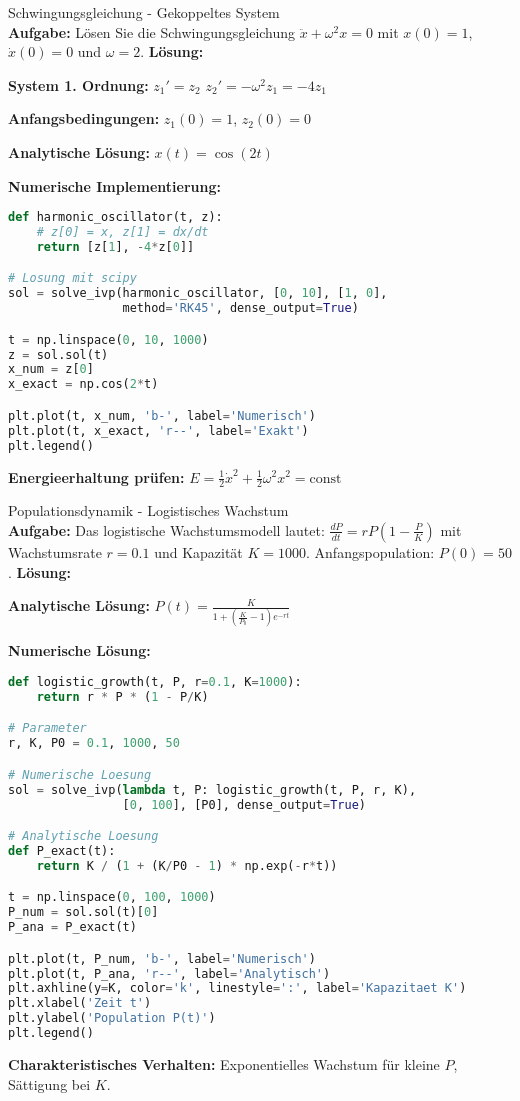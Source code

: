 \begin{example2}{Schwingungsgleichung - Gekoppeltes System}\\
\textbf{Aufgabe:} Lösen Sie die Schwingungsgleichung $\ddot{x} + \omega^2 x = 0$ mit $x(0) = 1$, $\dot{x}(0) = 0$ und $\omega = 2$.
\tcblower
\textbf{Lösung:}

\textbf{System 1. Ordnung:}
$z_1' = z_2$
$z_2' = -\omega^2 z_1 = -4z_1$

\textbf{Anfangsbedingungen:} $z_1(0) = 1$, $z_2(0) = 0$

\textbf{Analytische Lösung:} $x(t) = \cos(2t)$

\textbf{Numerische Implementierung:}
\begin{lstlisting}[language=Python, style=basesmol]
def harmonic_oscillator(t, z):
    # z[0] = x, z[1] = dx/dt
    return [z[1], -4*z[0]]

# Losung mit scipy
sol = solve_ivp(harmonic_oscillator, [0, 10], [1, 0], 
                method='RK45', dense_output=True)

t = np.linspace(0, 10, 1000)
z = sol.sol(t)
x_num = z[0]
x_exact = np.cos(2*t)

plt.plot(t, x_num, 'b-', label='Numerisch')
plt.plot(t, x_exact, 'r--', label='Exakt')
plt.legend()
\end{lstlisting}

\textbf{Energieerhaltung prüfen:} 
$E = \frac{1}{2}\dot{x}^2 + \frac{1}{2}\omega^2 x^2 = \text{const}$
\end{example2}

\begin{example2}{Populationsdynamik - Logistisches Wachstum}\\
\textbf{Aufgabe:} Das logistische Wachstumsmodell lautet:
$\frac{dP}{dt} = rP\left(1 - \frac{P}{K}\right)$
mit Wachstumsrate $r = 0.1$ und Kapazität $K = 1000$. Anfangspopulation: $P(0) = 50$.
\tcblower
\textbf{Lösung:}

\textbf{Analytische Lösung:}
$P(t) = \frac{K}{1 + \left(\frac{K}{P_0} - 1\right)e^{-rt}}$

\textbf{Numerische Lösung:}
\begin{lstlisting}[language=Python, style=basesmol]
def logistic_growth(t, P, r=0.1, K=1000):
    return r * P * (1 - P/K)

# Parameter
r, K, P0 = 0.1, 1000, 50

# Numerische Loesung
sol = solve_ivp(lambda t, P: logistic_growth(t, P, r, K), 
                [0, 100], [P0], dense_output=True)

# Analytische Loesung
def P_exact(t):
    return K / (1 + (K/P0 - 1) * np.exp(-r*t))

t = np.linspace(0, 100, 1000)
P_num = sol.sol(t)[0]
P_ana = P_exact(t)

plt.plot(t, P_num, 'b-', label='Numerisch')
plt.plot(t, P_ana, 'r--', label='Analytisch')
plt.axhline(y=K, color='k', linestyle=':', label='Kapazitaet K')
plt.xlabel('Zeit t')
plt.ylabel('Population P(t)')
plt.legend()
\end{lstlisting}

\textbf{Charakteristisches Verhalten:} Exponentielles Wachstum für kleine $P$, Sättigung bei $K$.
\end{example2}

